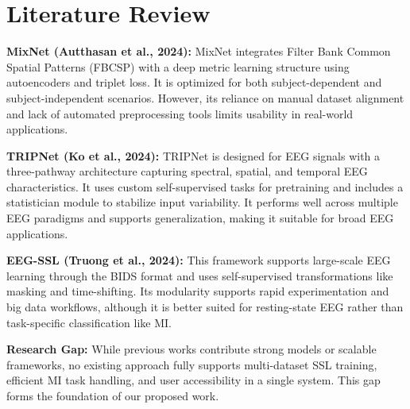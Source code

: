 \section{Literature Review}
\label{sec:literature-review}

\textbf{MixNet (Autthasan et al., 2024):}
MixNet integrates Filter Bank Common Spatial Patterns (FBCSP) with a deep metric learning structure using autoencoders and triplet loss. It is optimized for both subject-dependent and subject-independent scenarios. However, its reliance on manual dataset alignment and lack of automated preprocessing tools limits usability in real-world applications.

\vspace{0.5em}
\textbf{TRIPNet (Ko et al., 2024):}
TRIPNet is designed for EEG signals with a three-pathway architecture capturing spectral, spatial, and temporal EEG characteristics. It uses custom self-supervised tasks for pretraining and includes a statistician module to stabilize input variability. It performs well across multiple EEG paradigms and supports generalization, making it suitable for broad EEG applications.

\vspace{0.5em}
\textbf{EEG-SSL (Truong et al., 2024):}
This framework supports large-scale EEG learning through the BIDS format and uses self-supervised transformations like masking and time-shifting. Its modularity supports rapid experimentation and big data workflows, although it is better suited for resting-state EEG rather than task-specific classification like MI.

\vspace{0.5em}
\textbf{Research Gap:}
While previous works contribute strong models or scalable frameworks, no existing approach fully supports multi-dataset SSL training, efficient MI task handling, and user accessibility in a single system. This gap forms the foundation of our proposed work.

